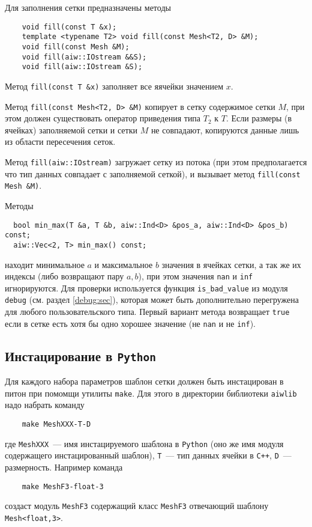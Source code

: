 Для заполнения сетки предназначены методы		
\begin{verbatim}		
    void fill(const T &x);
    template <typename T2> void fill(const Mesh<T2, D> &M);
    void fill(const Mesh &M);
    void fill(aiw::IOstream &&S);
    void fill(aiw::IOstream &S);
\end{verbatim}
Метод \verb'fill(const T &x)' заполняет все яячейки значением $x$.

Метод \verb'fill(const Mesh<T2, D> &M)' копирует в сетку содержимое сетки $M$, при этом должен существовать оператор
приведения типа $T_2$ к $T$. Если размеры (в ячейках) заполняемой сетки и сетки $M$ не совпадают, копируются данные лишь из области пересечения 
сеток.

Метод \verb'fill(aiw::IOstream)' загружает сетку из потока (при этом предполагается что тип данных 
совпадает с заполняемой сеткой), и вызывает метод \verb'fill(const Mesh &M)'.

Методы
\begin{verbatim}		
  bool min_max(T &a, T &b, aiw::Ind<D> &pos_a, aiw::Ind<D> &pos_b) const;
  aiw::Vec<2, T> min_max() const;
\end{verbatim}
находит минимальное $a$ и максимальное $b$
значения в ячейках сетки, а так же их индексы (либо возвращают пару
$a, b$), при этом значения \verb'nan' и \verb'inf' игнорируются.
Для проверки используется функция \verb'is_bad_value' из модуля
\verb'debug' (см. раздел \ref{debug:sec}), которая может быть дополнительно перегружена для любого
пользовательского типа. Первый вариант метода возвращает \verb'true'
если в сетке есть хотя бы одно хорошее значение (не \verb'nan' и не \verb'inf').

\subsection{Инстацирование в {\tt Python}}
Для каждого набора параметров шаблон сетки должен быть инстацирован в питон при помомщи утилиты \verb'make'.
Для этого в директории библиотеки \verb'aiwlib' надо набрать команду
\begin{verbatim}		
    make MeshXXX-T-D
\end{verbatim}
где \verb'MeshXXX'~--- имя инстацируемого шаблона в \verb'Python' (оно же имя модуля содержащего инстацированный шаблон),
\verb'T'~--- тип данных ячейки в \verb'C++', \verb'D'~--- размерность.
 Например команда 
\begin{verbatim}		
    make MeshF3-float-3
\end{verbatim}
создаст модуль \verb'MeshF3' содержащий класс \verb'MeshF3' отвечающий шаблону \verb'Mesh<float,3>'.

